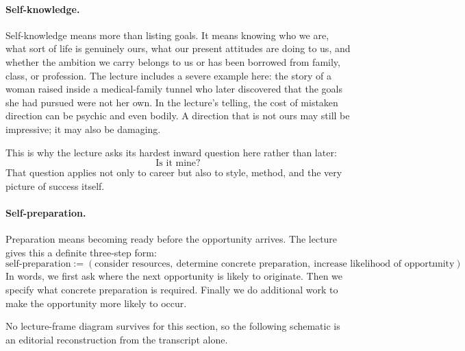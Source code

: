\paragraph{Self-knowledge.}
Self-knowledge means more than listing goals. It means knowing who we are, what sort of life is genuinely ours, what our present attitudes are doing to us, and whether the ambition we carry belongs to us or has been borrowed from family, class, or profession. The lecture includes a severe example here: the story of a woman raised inside a medical-family tunnel who later discovered that the goals she had pursued were not her own. In the lecture's telling, the cost of mistaken direction can be psychic and even bodily. A direction that is not ours may still be impressive; it may also be damaging.

This is why the lecture asks its hardest inward question here rather than later:
\[
\text{Is it mine?}
\]
That question applies not only to career but also to style, method, and the very picture of success itself.

\paragraph{Self-preparation.}
Preparation means becoming ready before the opportunity arrives. The lecture gives this a definite three-step form:
\begin{equation}
\text{self-preparation} := (\text{consider resources},\ \text{determine concrete preparation},\ \text{increase likelihood of opportunity}).
\end{equation}
In words, we first ask where the next opportunity is likely to originate. Then we specify what concrete preparation is required. Finally we do additional work to make the opportunity more likely to occur.

No lecture-frame diagram survives for this section, so the following schematic is an editorial reconstruction from the transcript alone.

\begin{figure}
\centering
{}
\end{figure}

